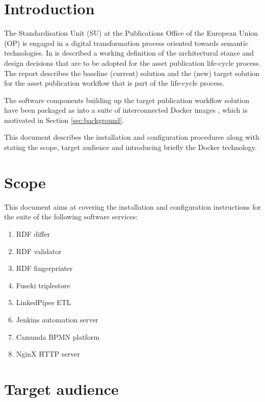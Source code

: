 \section{Introduction}
\label{sec:introduction}	

    The Standardisation Unit (SU) at the Publications Office of the European Union (OP) is engaged in a digital transformation process oriented towards semantic technologies. In \citep{costetchi2020d} is described a working definition of the architectural stance and design decisions that are to be adopted for the asset publication life-cycle process. The report describes the baseline (current) solution and the (new) target solution for the asset publication workflow that is part of the life-cycle process. 
    
    The software components building up the target publication workflow solution have been packaged as into a suite of interconnected Docker images \citep{docker-merkel2014docker}, which is motivated in Section \ref{sec:background}.
    
    This document describes the installation and configuration procedures along with stating the scope, target audience and introducing briefly the Docker technology.
    
\section{Scope}
\label{sec:scope}

	This document aims at covering the installation and configuration instructions for the suite of the following software services:
	
	\begin{enumerate}
		\item RDF differ
		\item RDF validator
		\item RDF fingerprinter
		\item Fuseki triplestore \cite{fuseki}
		\item LinkedPipes ETL  \citep{linkedpipes-klimek2016linkedpipes,linkedpipes-klimek2017linkedpipes}
		\item Jenkins automation server \citep{jenkins}
		\item Camunda BPMN platform \citep{camunda}
		\item NginX HTTP server \citep{reese2008nginx}
	\end{enumerate}

\section{Target audience}
\label{sec:audience}
	
